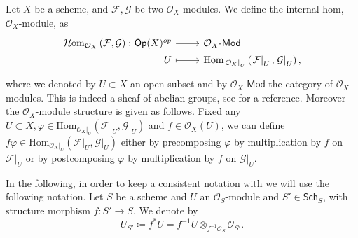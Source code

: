 \documentclass[../Main]{subfiles}
\begin{document}
\begin{defn}\label{defn:iHomOXMod}
	Let $X$ be a scheme, and $\mathcal{F}, \mathcal{G}$ be two $\mathcal{O}_{ X }$-modules.
	We define the internal hom, $\mathcal{O}_{ X }$-module, as
	\begin{equation*}
	\begin{tikzcd}[row sep = 0ex
		,/tikz/column 1/.append style={anchor=base east}
		,/tikz/column 2/.append style={anchor=base west}]
		\mathcal{H}\mathrm{om}_{ \mathcal{O}_{ X } } \left( \mathcal{F}, \mathcal{G} \right)\colon 
		\mathsf{Op}(X)^{op} \arrow[r, "", rightarrow] &
		\mathcal{O}_{ X }\text{-}\mathsf{Mod} \\
		U \arrow[r, "", mapsto] & 
		\mathrm{Hom}_{ \left.\mathcal{O}_{ X }\right|_{U}  } \left( \left.\mathcal{F}\right|_{U}, 
				\left.\mathcal{G}\right|_{U} \right)
	,\end{tikzcd}
	\end{equation*} 
	where we denoted by $U \subset X$ an open subset and by
	$\mathcal{O}_{ X }\text{-}\mathsf{Mod}$ the category of $\mathcal{O}_{ X }$-modules.
	This is indeed a sheaf of abelian groups, see 
	\cite[\href{https://stacks.math.columbia.edu/tag/00AK}{Section 00AK}]{SP} for a reference.
	Moreover the $\mathcal{O}_{ X }$-module structure is given as follows.
	Fixed any $U \subset X, \varphi \in \mathrm{Hom}_{ \left.\mathcal{O}_{ X }\right|_{U}  } 
	\left( \left.\mathcal{F}\right|_{U} , \left.\mathcal{G}\right|_{U} \right)$ and
	$f \in \mathcal{O}_{ X }(U)$, we can define $f \varphi \in
	\mathrm{Hom}_{ \left.\mathcal{O}_{ X }\right|_{U}  } \left( \left.\mathcal{F}\right|_{U} , 
	\left.\mathcal{G}\right|_{U} \right)$ either by precomposing $\varphi$ by multiplication
	by $f$ on $\left.\mathcal{F}\right|_{U}$ or by postcomposing $\varphi$
	by multiplication by $f$ on $\left.\mathcal{G}\right|_{U}$.
\end{defn}


\begin{rem}[]
	In the following, in order to keep a consistent notation with
	\cite{Messing} we will use the following notation.
	Let $S$ be a scheme and $U$ an $\mathcal{O}_{ S }$-module
	and $S' \in \mathsf{Sch}_{ S }$, with structure morphism
	$f\colon S' \to S$.
	We denote by 
	\begin{equation*}
	U_{S'} \coloneqq f^*U = 
	f^{-1}U \otimes_{f^{-1}\mathcal{O}_{ S }} \mathcal{O}_{ S' }
	.\end{equation*}
\end{rem}
\end{document}

